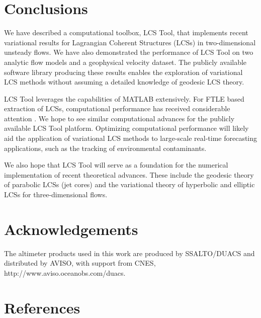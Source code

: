 \documentclass{elsarticle}
\begin{document}
\section{Conclusions}

We have described a computational toolbox, LCS Tool, that implements recent variational results for Lagrangian Coherent Structures (LCSs) in two-dimensional unsteady flows. We have also demonstrated the performance of LCS Tool on two analytic flow models and a geophysical velocity dataset. The publicly available software library producing these results enables the exploration of variational LCS methods without assuming a detailed knowledge of geodesic LCS theory.

LCS Tool leverages the capabilities of MATLAB extensively. For FTLE based extraction of LCSs, computational performance has received considerable attention \citep{conti12:_gpu_apu_finit_time_lyapun_expon,miron12:_anisot_lagran_coher_struc}. We hope to see similar computational advances for the publicly available LCS Tool platform. Optimizing computational performance will likely aid the application of variational LCS methods to large-scale real-time forecasting applications, such as the tracking of environmental contaminants\citep{olascoaga12:_forec}.

We also hope that LCS Tool will serve as a foundation for the numerical
implementation of recent theoretical advances. These include the geodesic theory of parabolic LCSs (jet cores)\citep{farazmand14:_shearless} and the variational theory of hyperbolic and elliptic LCSs for three-dimensional
flows\citep{blazevski14:_hyper_ellip_trans_barrier_three}.

\section*{Acknowledgements}

The altimeter products used in this work are produced by SSALTO/DUACS and distributed by AVISO, with support from CNES, http://www.aviso.oceanobs.com/duacs.

\section*{References}

 

\end{document}
